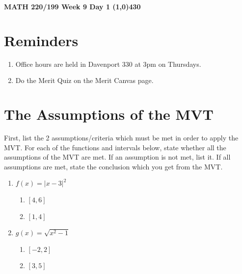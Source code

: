 \documentclass{article}
\begin{document}
\begin{center}
 \LARGE\bfseries MATH 220/199 Week 9 Day 1
 \line(1,0){430}
\end{center}
\section*{Reminders}
\begin{enumerate}
    \item Office hours are held in Davenport 330 at 3pm on Thursdays.
    \item Do the Merit Quiz on the Merit Canvas page.
\end{enumerate}
\section*{The Assumptions of the MVT}
First, list the 2 assumptions/criteria which must be met in order to apply the MVT.
\vfill
\noindent
For each of the functions and intervals below, state whether all the assumptions of the MVT are met. If an assumption is not met, list it. If all assumptions are met, state the conclusion which you get from the MVT.
\begin{enumerate}
    \item $f(x) = |x-3|^2$
    \begin{enumerate}
        \item $[4, 6]$
        \vfill
        \item $[1, 4]$
        \vfill
    \end{enumerate}
    \item $g(x) = \sqrt{x^2-1}$
    \begin{enumerate}
        \item $[-2, 2]$
        \vfill
        \item $[3, 5]$
        \vfill
    \end{enumerate}
\end{enumerate}
\newpage
\end{document}
